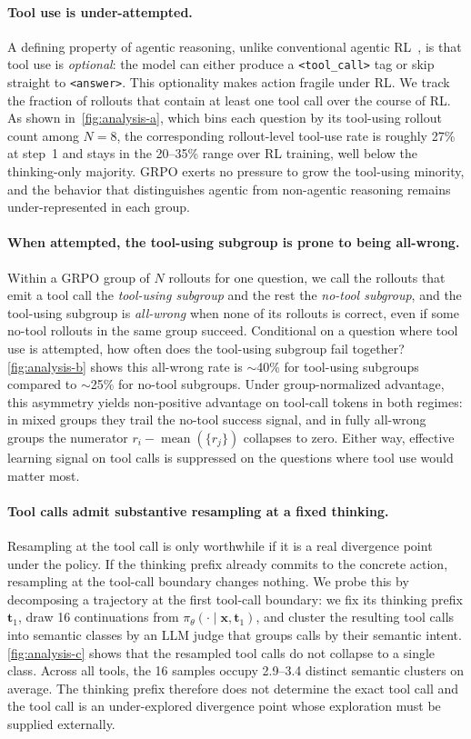 \documentclass{llmxive}
\providecommand{\bm}[1]{\boldsymbol{#1}}
\providecommand{\toolcall}{\texttt{<tool\_call>}\xspace}
\providecommand{\answer}{\texttt{<answer>}\xspace}
\providecommand{\vt}{{\bm{t}}}
\providecommand{\vx}{{\bm{x}}}
\begin{document}
\paragraph{Tool use is under-attempted.}
A defining property of agentic reasoning, unlike conventional agentic RL~\citep{arpo, ragen2}, is that tool use is \emph{optional}: the model can either produce a \toolcall tag or skip straight to \answer. This optionality makes action fragile under RL.
We track the fraction of rollouts that contain at least one tool call over the course of RL. As shown in~\autoref{fig:analysis-a}, which bins each question by its tool-using rollout count among $N=8$, the corresponding rollout-level tool-use rate is roughly 27\% at step~1 and stays in the 20--35\% range over RL training, well below the thinking-only majority.
GRPO exerts no pressure to grow the tool-using minority, and the behavior that distinguishes agentic from non-agentic reasoning remains under-represented in each group.

\paragraph{When attempted, the tool-using subgroup is prone to being all-wrong.}
Within a GRPO group of $N$ rollouts for one question, we call the rollouts that emit a tool call the \emph{tool-using subgroup} and the rest the \emph{no-tool subgroup}, and the tool-using subgroup is \emph{all-wrong} when none of its rollouts is correct, even if some no-tool rollouts in the same group succeed. Conditional on a question where tool use is attempted, how often does the tool-using subgroup fail together? \autoref{fig:analysis-b} shows this all-wrong rate is $\sim$40\% for tool-using subgroups compared to $\sim$25\% for no-tool subgroups. Under group-normalized advantage, this asymmetry yields non-positive advantage on tool-call tokens in both regimes: in mixed groups they trail the no-tool success signal, and in fully all-wrong groups the numerator $r_i - \operatorname{mean}(\{r_j\})$ collapses to zero. Either way, effective learning signal on tool calls is suppressed on the questions where tool use would matter most.

\paragraph{Tool calls admit substantive resampling at a fixed thinking.}
Resampling at the tool call is only worthwhile if it is a real divergence point under the policy.
If the thinking prefix already commits to the concrete action, resampling at the tool-call boundary changes nothing.
We probe this by decomposing a trajectory at the first tool-call boundary: we fix its thinking prefix $\vt_1$, draw 16 continuations from $\pi_\theta(\cdot \mid \vx, \vt_1)$, and cluster the resulting tool calls into semantic classes by an LLM judge that groups calls by their semantic intent. \autoref{fig:analysis-c} shows that the resampled tool calls do not collapse to a single class. Across all tools, the 16 samples occupy 2.9--3.4 distinct semantic clusters on average. The thinking prefix therefore does not determine the exact tool call and the tool call is an under-explored divergence point whose exploration must be supplied externally.
\end{document}
